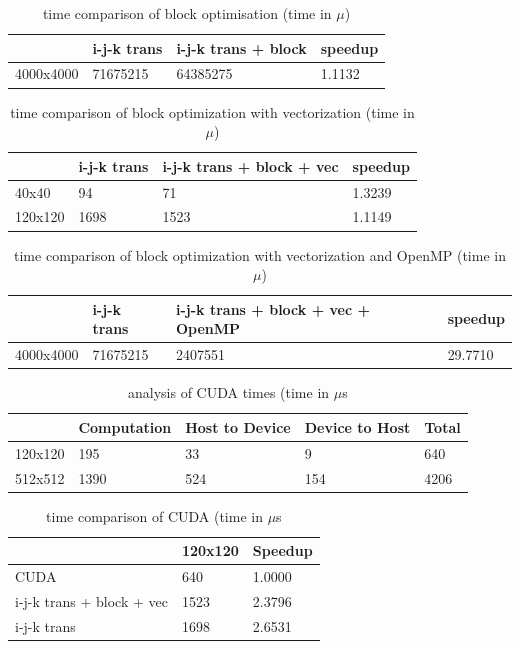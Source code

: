 \documentclass[a4paper]{report}
\begin{document}
\begin{table}[H]
\centering
\begin{tabular}{|l|l|l|l|}
\hline
          & i-j-k trans & i-j-k trans + block & speedup \\ \hline
4000x4000 & 71675215    & 64385275            & 1.1132  \\ \hline
\end{tabular}
\caption{time comparison of block optimisation (time in $\mu$)}
\end{table}

\begin{table}[H]
\centering
\begin{tabular}{|l|l|l|l|}
\hline
        & i-j-k trans & i-j-k trans + block + vec & speedup \\ \hline
40x40   & 94          & 71                        & 1.3239  \\ \hline
120x120 & 1698        & 1523                      & 1.1149  \\ \hline
\end{tabular}
\caption{time comparison of block optimization with vectorization (time in
$\mu$)}
\end{table}

\begin{table}[H]
\centering
\begin{tabular}{|l|l|l|l|}
\hline
          & i-j-k trans & i-j-k trans + block + vec + OpenMP & speedup \\ \hline
4000x4000 & 71675215    & 2407551                            & 29.7710 \\ \hline
\end{tabular}
\caption{time comparison of block optimization with vectorization and OpenMP (time in
$\mu$)}
\end{table}

\begin{table}[H]
\centering
\begin{tabular}{|l|l|l|l|l|}
\hline
        & Computation & Host to Device & Device to Host & Total \\ \hline
120x120 & 195         & 33             & 9              & 640   \\ \hline
512x512 & 1390        & 524            & 154            & 4206  \\ \hline
\end{tabular}
\caption{analysis of CUDA times (time in $\mu$s}
\end{table}

\begin{table}[H]
\centering
\begin{tabular}{|l|l|l|}
\hline
                          & 120x120 & Speedup \\ \hline
CUDA                      & 640     & 1.0000  \\ \hline
i-j-k trans + block + vec & 1523    & 2.3796  \\ \hline
i-j-k trans               & 1698    & 2.6531  \\ \hline
\end{tabular}
\caption{time comparison of CUDA (time in $\mu$s}
\end{table}
\end{document}
